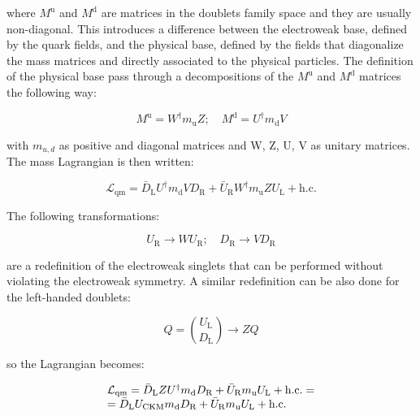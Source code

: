 where $M^{\text{u}}$ and  $M^{\text{d}}$ are matrices in the doublets family space and they are usually non-diagonal. This introduces a difference between the electroweak base, defined by the quark fields, and the physical base, defined by the fields that diagonalize the mass matrices and directly associated to the physical particles.
The definition of the physical base pass through a decompositions of the $M^{\text{u}}$ and $M^{\text{d}}$ matrices the following way:

\begin{equation}
M^{\text{u}} = W^{\dagger}m_{\text{u}}Z; \quad M^{\text{d}} = U^{\dagger}m_{\text{d}}V
\end{equation}

with $m_{u,d}$ as positive and diagonal matrices and W, Z, U, V as unitary matrices. The mass Lagrangian is then written:

\begin{equation}
\mathcal{L}_{\text{qm}} = \bar{D}_{\text{L}}U^{\dagger}m_{\text{d}}VD_{\text{R}} + \bar{U}_{\text{R}}W^{\dagger}m_{\text{u}}ZU_{\text{L}} + \text{h.c.}
\end{equation}

The following transformations:

\begin{equation}
U_{\text{R}} \longrightarrow W U_{\text{R}}; \quad D_{\text{R}} \longrightarrow V D_{\text{R}}
\end{equation}

are a redefinition of the electroweak singlets that can be performed without violating the electroweak symmetry. A similar redefinition can be also done for the left-handed doublets:

\begin{equation}
Q = \binom{U_{\text{L}}}{D_{\text{L}}} \longrightarrow ZQ
\end{equation}

so the Lagrangian becomes:

\begin{equation}
\begin{array}{l c l}
\mathcal{L}_{\text{qm}} = \bar{D}_{\text{L}}ZU^{\dagger}m_{\text{d}}D_{\text{R}} + \bar{U}_{\text{R}}m_{\text{u}}U_{\text{L}} + \text{h.c.} = \\
= \bar{D}_{\text{L}}U_{\text{CKM}}m_{\text{d}}D_{\text{R}} + \bar{U}_{\text{R}}m_{\text{u}}U_{\text{L}} + \text{h.c.}
\label{eq::Lqm_Uckm}
\end{array}
\end{equation}


